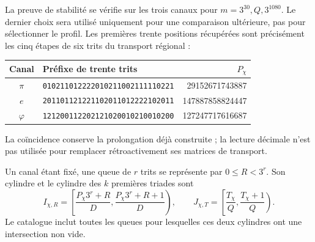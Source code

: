 La preuve de stabilité se vérifie sur les trois canaux pour
\(m=3^{30},Q,3^{1080}\). Le dernier choix sera utilisé uniquement
pour une comparaison ultérieure, pas pour sélectionner le profil. Les
premières trente positions récupérées sont précisément les cinq
étapes de six trits du transport régional :
\begin{center}\small
\begin{tabular}{@{}c l r@{}}\toprule
Canal&Préfixe de trente trits&\(P_\chi\)\\\midrule
\(\pi\)&\texttt{010211012222010211002111110221}&29152671743887\\
\(e\)&\texttt{201101121221102011012222102011}&147887858824447\\
\(\varphi\)&\texttt{121200112202121020010210010200}&127247717616687\\\bottomrule
\end{tabular}
\end{center}
La coïncidence conserve la prolongation déjà construite ; la lecture décimale
n'est pas utilisée pour remplacer rétroactivement ses matrices de transport.

Un canal étant fixé, une queue de \(r\) trits se représente par
\(0\leq R<3^r\). Son cylindre et le cylindre des \(k\) premières
triades sont
\begin{equation}
 I_{\chi,R}=\left[\frac{P_\chi3^r+R}{D},
                       \frac{P_\chi3^r+R+1}{D}\right),\qquad
 J_{\chi,T}=\left[\frac{T_\chi}{Q},\frac{T_\chi+1}{Q}\right).
 \label{x_reciprocidad:censo:dos-cilindros}
\end{equation}
Le catalogue inclut toutes les queues pour lesquelles ces deux cylindres
ont une intersection non vide.

